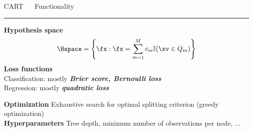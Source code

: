 \documentclass[11pt,compress,t,notes=noshow, xcolor=table]{beamer}
\begin{document}
\LARGE
\begin{frame}{\textcolor{gray!80}{CART} ~~ Functionality}
\normalsize
\vspace{-0.5cm}
\noindent \textcolor{gray!80}{\rule{\textwidth}{1pt}}

\textbf{\textcolor{gray!80}{Hypothesis space}} \\
$$\Hspace = \left\{ \fx: \fx = \sum_{m = 1}^M c_m \mathbb{I}(\xv \in Q_m) 
\right\}$$
\medskip
\textbf{\textcolor{gray!80}{Loss functions}} \\
Classification: mostly \textit{\textbf{Brier score, Bernoulli loss}}  \\
\medskip
Regression: mostly \textit{\textbf{quadratic loss}}

\textbf{\textcolor{gray!80}{Optimization}} {}{} Exhaustive search for optimal 
splitting criterion (greedy optimization) \\
\medskip
\textbf{\textcolor{gray!80}{Hyperparameters}} {}{} Tree depth, minimum number
of observations per node, ...  
  
\end{frame}

\end{document}
